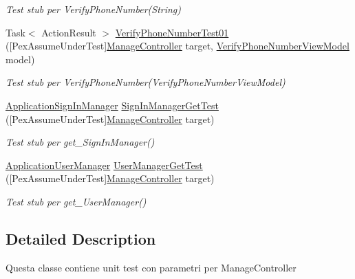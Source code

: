 \begin{DoxyCompactItemize}
\begin{DoxyCompactList}\small\item\em Test stub per Verify\+Phone\+Number(\+String)\end{DoxyCompactList}\item 
Task$<$ Action\+Result $>$ \mbox{\hyperlink{class_brew_day2_1_1_tests_1_1_manage_controller_test_aafc50666394efb3c470e54a70dd8d63b}{Verify\+Phone\+Number\+Test01}} (\mbox{[}Pex\+Assume\+Under\+Test\mbox{]}\mbox{\hyperlink{class_brew_day2_1_1_controllers_1_1_manage_controller}{Manage\+Controller}} target, \mbox{\hyperlink{class_brew_day2_1_1_models_1_1_verify_phone_number_view_model}{Verify\+Phone\+Number\+View\+Model}} model)
\begin{DoxyCompactList}\small\item\em Test stub per Verify\+Phone\+Number(\+Verify\+Phone\+Number\+View\+Model)\end{DoxyCompactList}\item 
\mbox{\hyperlink{class_brew_day2_1_1_application_sign_in_manager}{Application\+Sign\+In\+Manager}} \mbox{\hyperlink{class_brew_day2_1_1_tests_1_1_manage_controller_test_a7bf08b505c41c162c3db3ef73b0ef989}{Sign\+In\+Manager\+Get\+Test}} (\mbox{[}Pex\+Assume\+Under\+Test\mbox{]}\mbox{\hyperlink{class_brew_day2_1_1_controllers_1_1_manage_controller}{Manage\+Controller}} target)
\begin{DoxyCompactList}\small\item\em Test stub per get\+\_\+\+Sign\+In\+Manager()\end{DoxyCompactList}\item 
\mbox{\hyperlink{class_brew_day2_1_1_application_user_manager}{Application\+User\+Manager}} \mbox{\hyperlink{class_brew_day2_1_1_tests_1_1_manage_controller_test_acbbe52e22e75da9dd698dd9cf8b2e60c}{User\+Manager\+Get\+Test}} (\mbox{[}Pex\+Assume\+Under\+Test\mbox{]}\mbox{\hyperlink{class_brew_day2_1_1_controllers_1_1_manage_controller}{Manage\+Controller}} target)
\begin{DoxyCompactList}\small\item\em Test stub per get\+\_\+\+User\+Manager()\end{DoxyCompactList}\end{DoxyCompactItemize}


\subsection{Detailed Description}
Questa classe contiene unit test con parametri per Manage\+Controller



